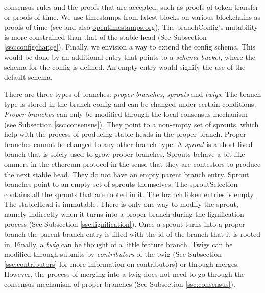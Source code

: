 consensus rules and the proofs that are accepted, such as proofs of token transfer or proofs of time. We use timestamps from latest blocks on various blockchains as proofs of time (see \cite{gipp2015decentralized} and also  \href{https://opentimestamps.org/}{opentimestamps.org}). The branchConfig's mutability is more constrained than that of the stable head (See Subsection \ref{ssc:configchange}).
Finally, we envision a way to extend the config schema. This would be done by an additional entry that points to a \textit{schema bucket}, where the schema for the config is defined. An empty entry would signify the use of the default schema.


There are three types of branches: \textit{proper branches}, \textit{sprouts} and \textit{twigs}. The branch type is stored in the branch config and can be changed under certain conditions. 
\textit{Proper branches} can only be modified through the local consensus mechanism (see Subsection \ref{ssc:consensus}). They point to a non-empty set of sprouts, which help with the process of producing stable heads in the proper branch. Proper branches cannot be changed to any other branch type. A \textit{sprout} is a short-lived branch that is solely used to grow proper branches. Sprouts behave a bit like ommers in the ethereum protocol in the sense that they are contestors to produce the next stable head. They do not have an empty parent branch entry. Sprout branches point to an empty set of sprouts themselves. The sproutSelection contains all the sprouts that are rooted in it. The branchToken entries is empty. The stableHead is immutable. There is only one way to modify the sprout, namely indirectly when it turns into a proper branch during the lignification process (See Subsection \ref{ssc:lignification}). Once a sprout turns into a proper branch the parent branch entry is filled with the id of the branch that it is rooted in. Finally, a \textit{twig} can be thought of a little feature branch. Twigs can be modified through submits by \textit{contributors} of the twig (See Subsection \ref{ssc:contributors} for more information on contributors) or through merges. However, the process of merging into a twig does not need to go through the consensus mechanism of proper branches (See Subsection \ref{ssc:consensus}).

